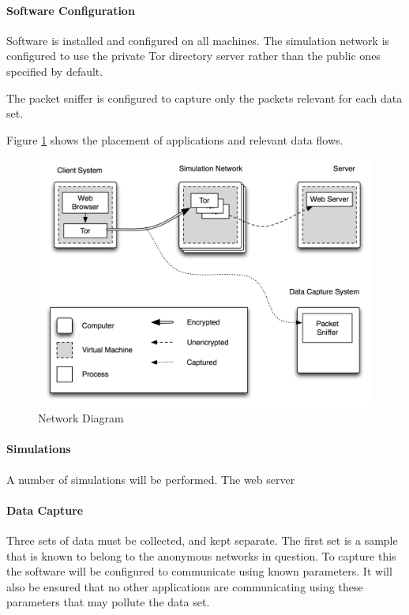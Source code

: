 \documentclass{ecuthesis}
\begin{document}
\paragraph{Software Configuration}

Software is installed and configured on all machines. The simulation network is configured to use the private Tor directory server rather than the public ones specified by default.

The packet sniffer is configured to capture only the packets relevant for each data set.

Figure \ref{network-diagram} shows the placement of applications and relevant data flows.

\begin{figure}
\includegraphics[width=\linewidth]{network-diagram}
\caption{Network Diagram}
\label{network-diagram}
\end{figure}

\paragraph{Simulations}

A number of simulations will be performed. The web server 

\paragraph{Data Capture}

Three sets of data must be collected, and kept separate. The first set is a sample that is known to belong to the anonymous networks in question. To capture this the software will be configured to communicate using known parameters. It will also be ensured that no other applications are communicating using these parameters that may pollute the data set.
\end{document}
